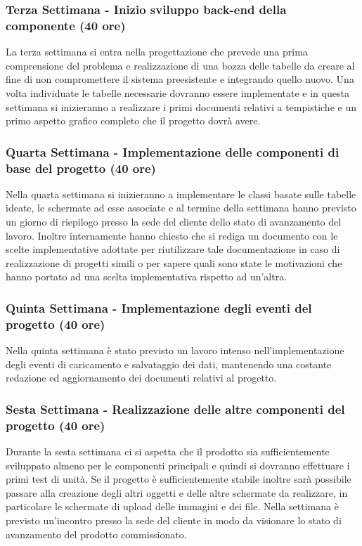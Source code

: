 \subsubsection*{Terza Settimana - Inizio sviluppo back-end della componente (40 ore)}
La terza settimana si entra nella progettazione che prevede una prima comprensione del problema e realizzazione di una bozza delle tabelle da creare al fine di non compromettere il sistema preesistente e integrando quello nuovo. Una volta individuate le tabelle necessarie dovranno essere implementate e in questa settimana si inizieranno a realizzare i primi documenti relativi a tempistiche e un primo aspetto grafico completo che il progetto dovrà avere.

\subsubsection*{Quarta Settimana - Implementazione delle componenti di base del progetto  (40 ore)}
Nella quarta settimana si inizieranno a implementare le classi basate sulle tabelle ideate, le schermate ad esse associate e al termine della settimana hanno previsto un giorno di riepilogo presso la sede del cliente dello stato di avanzamento del lavoro. Inoltre internamente hanno chiesto che si rediga un documento con le scelte implementative adottate per riutilizzare tale documentazione in caso di realizzazione di progetti simili o per sapere quali sono state le motivazioni che hanno portato ad una scelta implementativa rispetto ad un'altra.

\subsubsection*{Quinta Settimana - Implementazione degli eventi del progetto (40 ore)}
Nella quinta settimana è stato previsto un lavoro intenso nell'implementazione degli eventi di caricamento e salvataggio dei dati, mantenendo una costante redazione ed aggiornamento dei documenti relativi al progetto.

\subsubsection*{Sesta Settimana - Realizzazione delle altre componenti del progetto (40 ore)}
Durante la sesta settimana ci si aspetta che il prodotto sia sufficientemente sviluppato almeno per le componenti principali e quindi si dovranno effettuare i primi test di unità. Se il progetto è sufficientemente stabile inoltre sarà possibile passare alla creazione degli altri oggetti e delle altre schermate da realizzare, in particolare le schermate di upload delle immagini e dei file.
Nella settimana è previsto un'incontro presso la sede del cliente in modo da visionare lo stato di avanzamento del prodotto commissionato.

